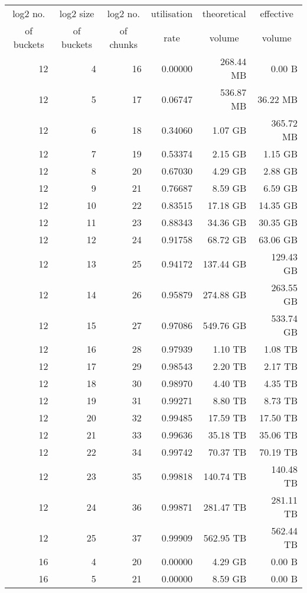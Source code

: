 \begin{longtable}{rrrrrr}\toprule
\multicolumn{1}{c}{log2 no.}& 
\multicolumn{1}{c}{log2 size} & 
\multicolumn{1}{c}{log2 no.}&
\multicolumn{1}{c}{utilisation}&
\multicolumn{1}{c}{theoretical}&
\multicolumn{1}{c}{effective}\\
\multicolumn{1}{c}{of buckets}&
\multicolumn{1}{c}{of buckets}&
\multicolumn{1}{c}{of chunks}&
\multicolumn{1}{c}{rate}&
\multicolumn{1}{c}{volume}&
\multicolumn{1}{c}{volume}\\
\midrule
12 & 4 & 16 & 0.00000 & 268.44 MB & 0.00 B \\
12 & 5 & 17 & 0.06747 & 536.87 MB & 36.22 MB \\
12 & 6 & 18 & 0.34060 & 1.07 GB & 365.72 MB \\
12 & 7 & 19 & 0.53374 & 2.15 GB & 1.15 GB \\
12 & 8 & 20 & 0.67030 & 4.29 GB & 2.88 GB \\
12 & 9 & 21 & 0.76687 & 8.59 GB & 6.59 GB \\
12 & 10 & 22 & 0.83515 & 17.18 GB & 14.35 GB \\
12 & 11 & 23 & 0.88343 & 34.36 GB & 30.35 GB \\
12 & 12 & 24 & 0.91758 & 68.72 GB & 63.06 GB \\
12 & 13 & 25 & 0.94172 & 137.44 GB & 129.43 GB \\
12 & 14 & 26 & 0.95879 & 274.88 GB & 263.55 GB \\
12 & 15 & 27 & 0.97086 & 549.76 GB & 533.74 GB \\
12 & 16 & 28 & 0.97939 & 1.10 TB & 1.08 TB \\
12 & 17 & 29 & 0.98543 & 2.20 TB & 2.17 TB \\
12 & 18 & 30 & 0.98970 & 4.40 TB & 4.35 TB \\
12 & 19 & 31 & 0.99271 & 8.80 TB & 8.73 TB \\
12 & 20 & 32 & 0.99485 & 17.59 TB & 17.50 TB \\
12 & 21 & 33 & 0.99636 & 35.18 TB & 35.06 TB \\
12 & 22 & 34 & 0.99742 & 70.37 TB & 70.19 TB \\
12 & 23 & 35 & 0.99818 & 140.74 TB & 140.48 TB \\
12 & 24 & 36 & 0.99871 & 281.47 TB & 281.11 TB \\
12 & 25 & 37 & 0.99909 & 562.95 TB & 562.44 TB \\
16 & 4 & 20 & 0.00000 & 4.29 GB & 0.00 B \\
16 & 5 & 21 & 0.00000 & 8.59 GB & 0.00 B \\

\end{longtable}
